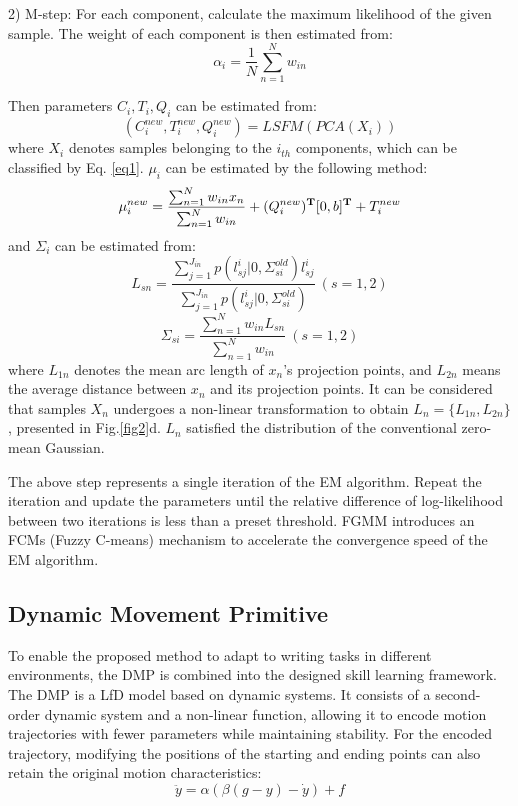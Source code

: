 \documentclass[conference]{IEEEtran}
\begin{document}
2) M-step: For each component, calculate the maximum likelihood of the given sample. The weight of each component is then estimated from:
\begin{equation}
    \alpha_i=\frac{1}{N}\sum\limits^N_{n=1}w_{in}
\end{equation}

Then parameters $C_i,T_i,Q_i$ can be estimated from:
\begin{equation}
    (C^{new}_i,T^{new}_i,Q^{new}_i)=LSFM(PCA(X_i))
\end{equation}
where $X_i$ denotes samples belonging to the $i_{th}$ components, which can be classified by Eq. \ref{eq1}. $\mu_i$ can be estimated by the following method:
\begin{equation}
    \mu_i^{new}=\frac{\sum^N_{n=1}w_{in}x_n}{\sum^N_{n=1}w_{in}}+(Q_i^{new})^{\bf{T}}[0,b]^{\bf{T}}+T_i^{new}
\end{equation}
and $\Sigma_i$ can be estimated from:
\begin{equation}
    L_{sn}=\frac{\sum^{J_{in}}_{j=1}p(l^i_{sj}|0,\Sigma^{old}_{si})l^i_{sj}}{\sum^{J_{in}}_{j=1}p(l^i_{sj}|0,\Sigma^{old}_{si})}~(s=1,2)
\end{equation}
\begin{equation}
    \Sigma_{si}=\frac{\sum_{n=1}^Nw_{in}L_{sn}}{\sum_{n=1}^Nw_{in}}~(s=1,2)
\end{equation}
where $L_{1n}$ denotes the mean arc length of $x_n$'s projection points, and $L_{2n}$ means the average distance between $x_n$ and its projection points. It can be considered that samples $X_n$ undergoes a non-linear transformation to obtain $L_n=\{L_{1n},L_{2n}\}$, presented in Fig.\ref{fig2}d. $L_n$ satisfied the distribution of the conventional zero-mean Gaussian.

The above step represents a single iteration of the EM algorithm. Repeat the iteration and update the parameters until the relative difference of log-likelihood between two iterations is less than a preset threshold. FGMM introduces an FCMs (Fuzzy C-means) mechanism to accelerate the convergence speed of the EM algorithm.

\subsection{Dynamic Movement Primitive}
To enable the proposed method to adapt to writing tasks in different environments, the DMP is combined into the designed skill learning framework. The DMP is a LfD model based on dynamic systems\cite{Ijspeert2013}. It consists of a second-order dynamic system and a non-linear function, allowing it to encode motion trajectories with fewer parameters while maintaining stability. For the encoded trajectory, modifying the positions of the starting and ending points can also retain the original motion characteristics:
\begin{equation}
    \ddot y = \alpha(\beta(g-y)-\dot y) + f
    \label{eq4}
\end{equation}
\end{document}
